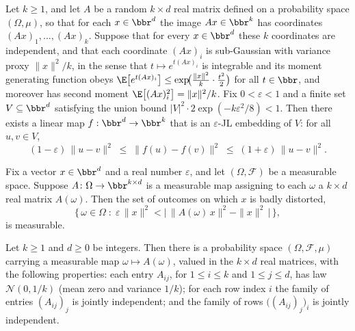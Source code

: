 \begin{theorem}
\label{johnson_lindenstrauss_of_subgaussian}
\leanok
{}
Let $k \ge 1$, and let $A$ be a random $k \times d$ real matrix defined on a probability
space $(\Omega,\mu)$, so that for each $x \in \bbr^d$ the image $Ax \in \bbr^k$ has
coordinates $(Ax)_1,\dots,(Ax)_k$. Suppose that for every $x \in \bbr^d$ these $k$
coordinates are independent, and that each coordinate $(Ax)_i$ is sub-Gaussian with
variance proxy $\|x\|^2/k$, in the sense that $t \mapsto e^{t(Ax)_i}$ is integrable and
its moment generating function obeys $\E\!\left[e^{t(Ax)_i}\right] \le
\exp\!\bigl(\tfrac{\|x\|^2}{k}\cdot\tfrac{t^2}{2}\bigr)$ for all $t \in \bbr$, and
moreover has second moment $\E\!\left[(Ax)_i^2\right] = \|x\|^2/k$. Fix $0 < \varepsilon
< 1$ and a finite set $V \subseteq \bbr^d$ satisfying the union bound $|V|^2 \cdot
2\exp(-k\varepsilon^2/8) < 1$. Then there exists a linear map $f : \bbr^d \to \bbr^k$
that is an $\varepsilon$-JL embedding of $V$: for all $u,v \in V$,
\[
  (1-\varepsilon)\,\|u-v\|^2 \;\le\; \|f(u)-f(v)\|^2 \;\le\; (1+\varepsilon)\,\|u-v\|^2.
\]
\end{theorem}

\begin{lemma}
\label{measurableSet_badSingle}
\leanok
{}
Fix a vector $x\in\bbr^d$ and a real number $\varepsilon$, and let
$(\Omega,\mathcal{F})$ be a measurable space. Suppose $A\colon\Omega\to\bbr^{k\times d}$
is a measurable map assigning to each $\omega$ a $k\times d$ real matrix $A(\omega)$.
Then the set of outcomes on which $x$ is badly distorted,
\[
\bigl\{\,\omega\in\Omega \;:\; \varepsilon\,\|x\|^2 < \bigl|\,\|A(\omega)\,x\|^2 -
\|x\|^2\,\bigr|\,\bigr\},
\]
is measurable.
\end{lemma}

\begin{lemma}
\label{exists_iid_gaussian_matrix}
\leanok
{}
Let $k \ge 1$ and $d \ge 0$ be integers. Then there is a probability space $(\Omega,
\mathcal{F}, \mu)$ carrying a measurable map $\omega \mapsto A(\omega)$, valued in the
$k \times d$ real matrices, with the following properties: each entry $A_{ij}$, for $1
\le i \le k$ and $1 \le j \le d$, has law $\mathcal{N}(0, 1/k)$ (mean zero and variance
$1/k$); for each row index $i$ the family of entries $(A_{ij})_{j}$ is jointly
independent; and the family of rows $\bigl((A_{ij})_{j}\bigr)_{i}$ is jointly
independent.
\end{lemma}

